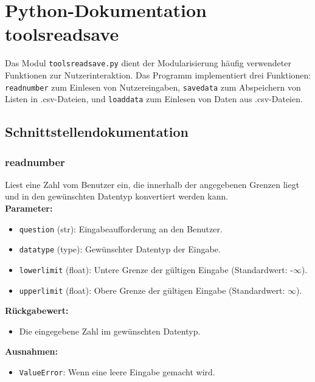 \documentclass{scrreprt}
\begin{document}
\newpage

\section{Python-Dokumentation tools\textunderscore read\textunderscore save} \label{sec:toolsreadsave}
Das Modul \texttt{tools\textunderscore read\textunderscore save.py} dient der Modularisierung häufig verwendeter Funktionen zur Nutzerinteraktion. Das Programm implementiert drei Funktionen: \texttt{read\textunderscore number} zum Einlesen von Nutzereingaben, \texttt{save\textunderscore data} zum Abspeichern von Listen in .csv-Dateien, und \texttt{load\textunderscore data} zum Einlesen von Daten aus .csv-Dateien. \\

\subsection{Schnittstellendokumentation}
\subsubsection{read\textunderscore number}
Liest eine Zahl vom Benutzer ein, die innerhalb der angegebenen Grenzen liegt und in den gewünschten Datentyp konvertiert werden kann. \\

\noindent \textbf{Parameter:}
\begin{itemize}
    \item \texttt{question} (str): Eingabeaufforderung an den Benutzer.
    \item \texttt{data\textunderscore type} (type): Gewünschter Datentyp der Eingabe.
    \item \texttt{lower\textunderscore limit} (float): Untere Grenze der gültigen Eingabe (Standardwert: -$\infty$).
    \item \texttt{upper\textunderscore limit} (float): Obere Grenze der gültigen Eingabe (Standardwert: $\infty$).
\end{itemize}

\noindent \textbf{Rückgabewert:}
\begin{itemize}
    \item Die eingegebene Zahl im gewünschten Datentyp.
\end{itemize}

\noindent \textbf{Ausnahmen:}
\begin{itemize}
    \item \texttt{ValueError}: Wenn eine leere Eingabe gemacht wird.
\end{itemize}
\end{document}
